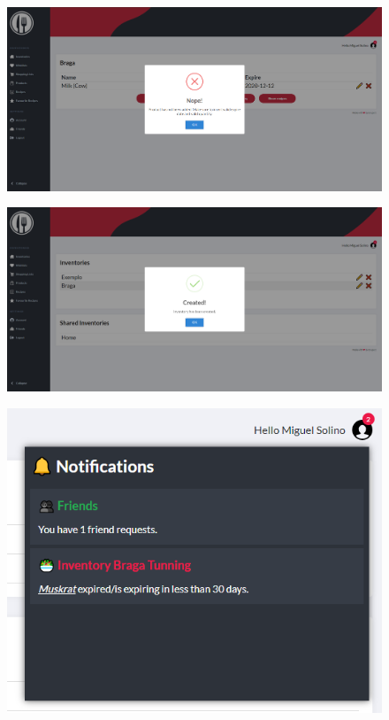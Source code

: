 \documentclass[a4paper]{report}
\begin{document}
    \begin{figure}[H]
        \centering
            \includegraphics[width=\textwidth]{images/produto_final/exemplo_erro.png}
    \end{figure}

    \begin{figure}[H]
        \centering
            \includegraphics[width=\textwidth]{images/produto_final/exemplo_sucesso.png}
    \end{figure}

    \begin{figure}[H]
        \centering
            \includegraphics[width=\textwidth]{images/produto_final/notificacoes.png}
    \end{figure}
\end{document}
